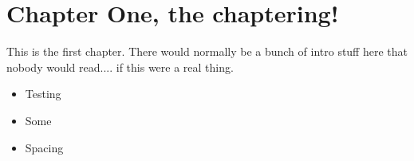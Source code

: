 \chapter{Chapter One, the chaptering!}

This is the first chapter. There would normally be a bunch of intro stuff here that nobody would read.... if this were a real thing.

\begin{itemize}
\item Testing
\item Some
\item Spacing
\end{itemize}
